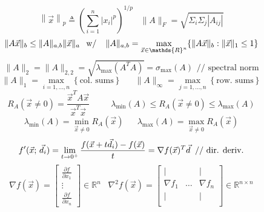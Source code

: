 \documentclass[twocolumn,12pt]{article}    %
\begin{document}
\vspace{-20pt} 
\begin{equation*}
    \left\|\Vec{x}\right\|_p \triangleq \left( \sum^n_{i=1} |x_i|^p\right)^{1/p} \hspace{10pt}  \|A\|_F =  \sqrt{\Sigma_{i}\Sigma_{j} |A_{ij}|} 
\end{equation*}
\begin{equation*}
    \|A\Vec{x}\|_b \leq \|A\|_{a,b} \|\Vec{x}\|_a \hspace{7.5pt} \text{w/} \hspace{7.5pt} \ \|A\|_{a,b} = \max_{\Vec{x} \in \mathds{R}^n} \{\|A\Vec{x}\|_b : \|\Vec{x}\|_1 \leq 1\}
\end{equation*}
\begin{equation*}
    \|A\|_2 = \|A\|_{2,2} = \sqrt{\lambda_{\max}(A^TA)} = \sigma_{\max}(A) \hspace{5pt} \text{// spectral norm}
\end{equation*}
\begin{equation*}
    \|A\|_1 = \max_{i=1,...,n} \left\{\text{col. sums}\right\} \hspace{19pt} \|A\|_\infty = \max_{j=1,...,n} \left\{\text{row. sums}\right\}
\end{equation*}
\begin{equation*}
      R_{A}(\vec{x}\neq 0 ) =\frac{\vec{x}^TA\vec{x}}{\vec{x}^T\vec{x}}\hspace{30pt} \lambda_{\min}(A) \leq R_{A}(\vec{x}\neq0)\leq \lambda_{\max}(A) 
\end{equation*}
\begin{equation*}
      \lambda_{\min}(A) = \min_{\vec{x}\neq0} R_{A}(\vec{x}) \hspace{19pt} \lambda_{\max}(A) = \max_{\vec{x}\neq0} R_{A}(\vec{x})
\end{equation*}
\begin{equation*}
     f'(\vec{x};\, \vec{d}_i) = \lim_{t\to0^+} \frac{f(\vec{x} +t \vec{d}_i) -f(\vec{x})}{t} = \nabla f(\vec{x})^T \vec{d} \hspace{5.5pt} \text{// dir. deriv.}
\end{equation*}
\begin{equation*}
    \nabla f(\Vec{x}) = \begin{bmatrix} \frac{\partial{f}}{\partial{x_1}}\\ \vdots \\ \frac{\partial{f}}{\partial{x_n}} \end{bmatrix} 
    \in \mathds{R}^n \hspace{10pt}
    \nabla^2 f(\vec{x}) = \begin{bmatrix}
        | & & |\\
        \nabla f_1 & \dots & \nabla f_n\\
        | & & |\\
    \end{bmatrix} \in \mathds{R}^{n \times n}
\end{equation*}
\end{document}

